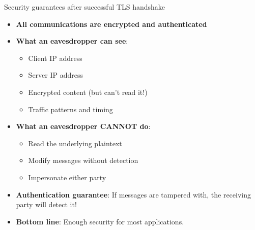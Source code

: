 \ifdefined\PRESENTATION\else\PassOptionsToClass{handout}{beamer}\fi\documentclass[aspectratio=169, lualatex]{beamer}
\begin{document}
\begin{frame}{Security guarantees after successful TLS handshake}
	\begin{itemize}
		\item \textbf{All communications are encrypted and authenticated}
		\item \textbf{What an eavesdropper can see}:
		      \begin{itemize}
			      \item Client IP address
			      \item Server IP address
			      \item Encrypted content (but can't read it!)
			      \item Traffic patterns and timing
		      \end{itemize}
		\item \textbf{What an eavesdropper CANNOT do}:
		      \begin{itemize}
			      \item Read the underlying plaintext
			      \item Modify messages without detection
			      \item Impersonate either party
		      \end{itemize}
		\item \textbf{Authentication guarantee}: If messages are tampered with, the receiving party will detect it!
		\item \textbf{Bottom line}: Enough security for most applications.
	\end{itemize}
\end{frame}
\end{document}
